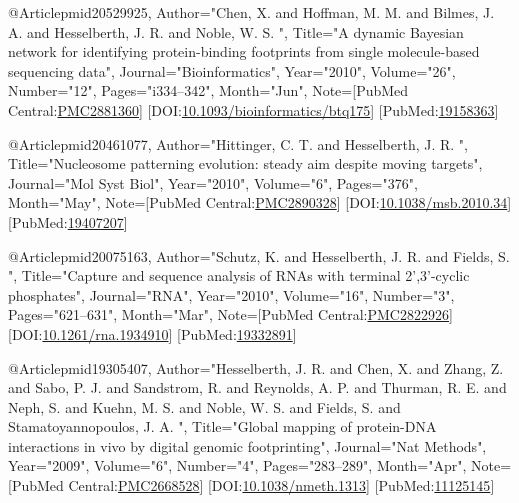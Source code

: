 @Article{pmid20529925,
   Author="Chen, X.  and Hoffman, M. M.  and Bilmes, J. A.  and Hesselberth, J. R.  and Noble, W. S. ",
   Title="{{A} dynamic {B}ayesian network for identifying protein-binding footprints from single molecule-based sequencing data}",
   Journal="Bioinformatics",
   Year="2010",
   Volume="26",
   Number="12",
   Pages="i334--342",
   Month="Jun",
   Note={[PubMed Central:\href{https://www.ncbi.nlm.nih.gov/pmc/articles/PMC2881360}{PMC2881360}] [DOI:\href{https://dx.doi.org/10.1093/bioinformatics/btq175}{10.1093/bioinformatics/btq175}] [PubMed:\href{https://www.ncbi.nlm.nih.gov/pubmed/19158363}{19158363}] }
}

@Article{pmid20461077,
   Author="Hittinger, C. T.  and Hesselberth, J. R. ",
   Title="{{N}ucleosome patterning evolution: steady aim despite moving targets}",
   Journal="Mol Syst Biol",
   Year="2010",
   Volume="6",
   Pages="376",
   Month="May",
   Note={[PubMed Central:\href{https://www.ncbi.nlm.nih.gov/pmc/articles/PMC2890328}{PMC2890328}] [DOI:\href{https://dx.doi.org/10.1038/msb.2010.34}{10.1038/msb.2010.34}] [PubMed:\href{https://www.ncbi.nlm.nih.gov/pubmed/19407207}{19407207}] }
}

@Article{pmid20075163,
   Author="Schutz, K.  and Hesselberth, J. R.  and Fields, S. ",
   Title="{{C}apture and sequence analysis of {R}{N}{A}s with terminal 2',3'-cyclic phosphates}",
   Journal="RNA",
   Year="2010",
   Volume="16",
   Number="3",
   Pages="621--631",
   Month="Mar",
   Note={[PubMed Central:\href{https://www.ncbi.nlm.nih.gov/pmc/articles/PMC2822926}{PMC2822926}] [DOI:\href{https://dx.doi.org/10.1261/rna.1934910}{10.1261/rna.1934910}] [PubMed:\href{https://www.ncbi.nlm.nih.gov/pubmed/19332891}{19332891}] }
}

@Article{pmid19305407,
   Author="Hesselberth, J. R.  and Chen, X.  and Zhang, Z.  and Sabo, P. J.  and Sandstrom, R.  and Reynolds, A. P.  and Thurman, R. E.  and Neph, S.  and Kuehn, M. S.  and Noble, W. S.  and Fields, S.  and Stamatoyannopoulos, J. A. ",
   Title="{{G}lobal mapping of protein-{D}{N}{A} interactions in vivo by digital genomic footprinting}",
   Journal="Nat Methods",
   Year="2009",
   Volume="6",
   Number="4",
   Pages="283--289",
   Month="Apr",
   Note={[PubMed Central:\href{https://www.ncbi.nlm.nih.gov/pmc/articles/PMC2668528}{PMC2668528}] [DOI:\href{https://dx.doi.org/10.1038/nmeth.1313}{10.1038/nmeth.1313}] [PubMed:\href{https://www.ncbi.nlm.nih.gov/pubmed/11125145}{11125145}] }
}

